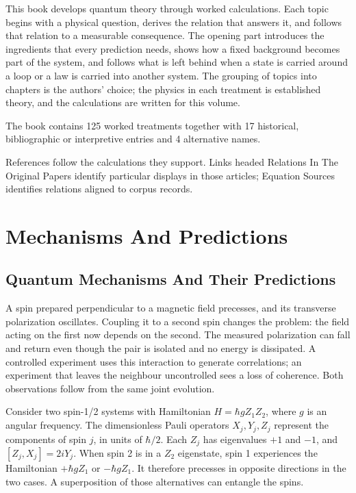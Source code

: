 \documentclass[11pt,oneside]{book}
\begin{document}
This book develops quantum theory through worked calculations. Each topic begins with a physical question, derives the relation that answers it, and follows that relation to a measurable consequence. The opening part introduces the ingredients that every prediction needs, shows how a fixed background becomes part of the system, and follows what is left behind when a state is carried around a loop or a law is carried into another system. The grouping of topics into chapters is the authors' choice; the physics in each treatment is established theory, and the calculations are written for this volume.

The book contains 125 worked treatments together with 17 historical, bibliographic or interpretive entries and 4 alternative names. 

References follow the calculations they support. Links headed Relations In The Original Papers identify particular displays in those articles; Equation Sources identifies relations aligned to corpus records.

\mainmatter

\part{Mechanisms And Predictions}

\chapter{Quantum Mechanisms And Their Predictions}\label{chap:mechanisms-predictions}

A spin prepared perpendicular to a magnetic field precesses, and its
transverse polarization oscillates. Coupling it to a second spin changes
the problem: the field acting on the first now depends on the second.
The measured polarization can fall and return even though the pair is
isolated and no energy is dissipated. A controlled experiment uses this
interaction to generate correlations; an experiment that leaves the
neighbour uncontrolled sees a loss of coherence. Both observations follow
from the same joint evolution.

Consider two spin-1/2 systems with Hamiltonian \(H=\hbar gZ_1Z_2\), where
\(g\) is an angular frequency. The dimensionless Pauli operators
\(X_j,Y_j,Z_j\) represent the components of spin \(j\), in units of
\(\hbar/2\). Each \(Z_j\) has eigenvalues \(+1\) and \(-1\), and
\([Z_j,X_j]=2iY_j\). When spin 2 is in a \(Z_2\) eigenstate, spin 1
experiences the Hamiltonian \(+\hbar gZ_1\) or \(-\hbar gZ_1\).
It therefore precesses in opposite directions in the two cases. A
superposition of those alternatives can entangle the spins.
\end{document}
